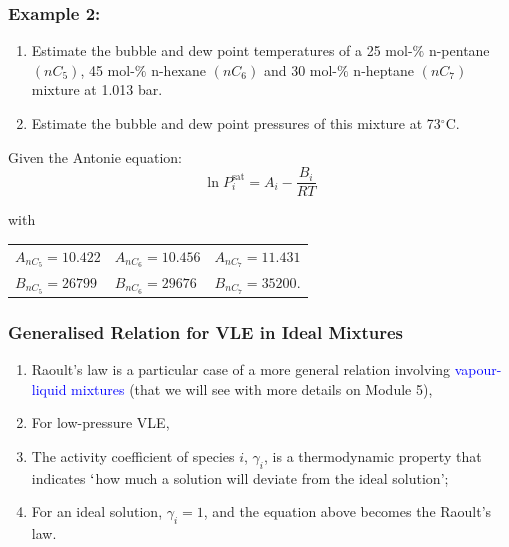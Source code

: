 \documentclass[10pt,compress,unknownkeysallowed]{beamer}
\newcommand{\frc}{\displaystyle\frac}
\begin{document}
\begin{frame} %
  \frametitle{Example 2:}
    \begin{enumerate}
        \item Estimate the bubble and dew point temperatures of a 25 mol-$\%$ n-pentane $\left(nC_{5}\right)$, 45 mol-$\%$ n-hexane $\left(nC_{6}\right)$ and 30 mol-$\%$ n-heptane $\left(nC_{7}\right)$ mixture at 1.013 bar. 
        \item  Estimate the bubble and dew point pressures of this mixture at 73$^{\circ}$C.
    \end{enumerate}
    Given the Antonie equation:
    \begin{displaymath}
       \ln P_{i}^{\text{sat}} = A_{i} - \frc{B_{i}}{RT}
    \end{displaymath}

    with
    \begin{center}
       \begin{tabular}{l l l} 
          $A_{nC_{5}}=10.422$ & $A_{nC_{6}}=10.456$ & $A_{nC_{7}}=11.431$ \\
          $B_{nC_{5}}=26799$  & $B_{nC_{6}}=29676$  & $B_{nC_{7}}=35200$.
       \end{tabular}
    \end{center}
\end{frame}
\normalsize

\begin{frame}
  \frametitle{Generalised Relation for VLE in Ideal Mixtures}
  \begin{enumerate}
      \item<1-> Raoult's law is a particular case of a more general relation involving \textcolor{blue}{vapour-liquid mixtures} (that we will see with more details on Module 5),
      \item<3-> For low-pressure VLE,
      \item<4-> The activity  coefficient of species $i$, $\gamma_{i}$, is a thermodynamic property that indicates $\lq$how much a solution will deviate from the ideal solution';
      \item<4-> For an ideal solution, $\gamma_{i}=1$, and the equation above becomes the Raoult's law.  
  \end{enumerate}
\end{frame}
\end{document}
